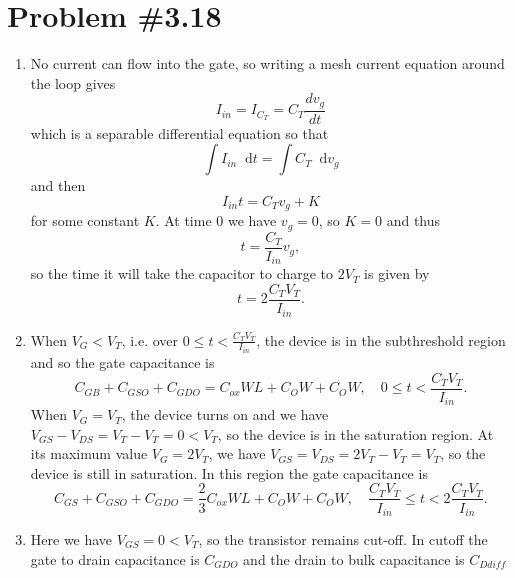 \documentclass{article}
\newcommand\dif{\mathop{}\!\mathrm{d}}
\begin{document}
\section*{Problem \#3.18}
\begin{enumerate}[label=(\alph*)]
  \item{
    No current can flow into the gate, so writing a mesh current
    equation around the loop gives
    $$
    I_{in} = I_{C_T} = C_T \frac{dv_g}{dt}
    $$
    which is a separable differential equation so that
    $$
    \int I_{in} \dif t = \int C_T \dif v_g
    $$
    and then
    $$
    I_{in} t = C_T v_g + K
    $$
    for some constant $K$. At time 0 we have $v_g = 0$, so $K = 0$ and thus
    $$
    t = \frac{C_T}{I_{in}} v_g,
    $$
    so the time it will take the capacitor to charge to $2 V_T$ is given by
    $$
    t = 2\frac{C_T V_T}{I_{in}}.
    $$
  }
  \item{
    When $V_G < V_T$, i.e. over $0 \leq t < \frac{C_T V_T}{I_{in}}$,
    the device is in the subthreshold region and so the gate capacitance
    is
    $$
    C_{GB} + C_{GSO} + C_{GDO} = C_{ox} WL + C_O W + C_O W, \quad
    0 \leq t < \frac{C_T V_T}{I_{in}}.
    $$
    When $V_G = V_T$, the device turns on and we have $V_{GS} - V_{DS} = V_T - V_T = 0 < V_T$,
    so the device is in the saturation region. At its maximum value $V_G = 2 V_T$, we have
    $V_{GS} = V_{DS} = 2 V_T - V_T = V_T$, so the device is still in saturation. In this region
    the gate capacitance is
    $$
    C_{GS} + C_{GSO} + C_{GDO} = \frac{2}{3}C_{ox} W L + C_O W + C_O W, \quad
    \frac{C_T V_T}{I_{in}} \leq t < 2\frac{C_T V_T}{I_{in}}.
    $$
  }
  \item{
    Here we have $V_{GS} = 0 < V_T$, so the transistor remains cut-off.
    In cutoff the gate to drain capacitance is $C_{GDO}$ and the drain
    to bulk capacitance is $C_{Ddiff}$
  }
\end{enumerate}
\end{document}
